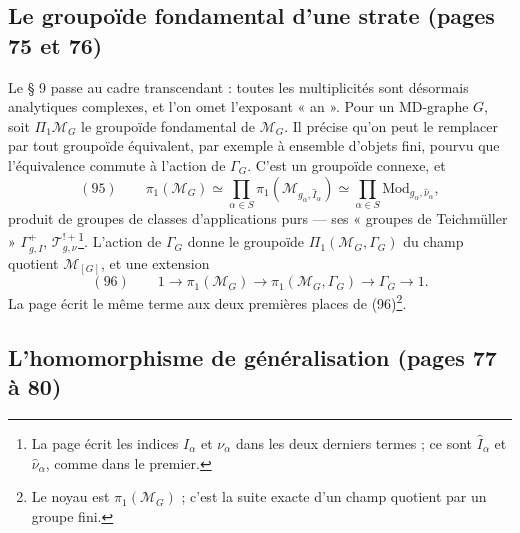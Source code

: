 \documentclass[11pt,a4paper]{article}
\begin{document}
\subsection*{Le groupoïde fondamental d'une strate (pages 75 et 76)}

Le § 9 passe au cadre transcendant : toutes les multiplicités sont désormais
analytiques complexes, et l'on omet l'exposant « an ». Pour un MD-graphe $G$,
soit $\Pi_1\mathcal{M}_G$ le groupoïde fondamental de $\mathcal{M}_G$. Il
précise qu'on peut le remplacer par tout groupoïde équivalent, par exemple à
ensemble d'objets fini, pourvu que l'équivalence commute à l'action de
$\Gamma_G$. C'est un groupoïde connexe, et
\[
(95) \qquad \pi_1(\mathcal{M}_G) \simeq \prod_{\alpha \in S}
\pi_1(\mathcal{M}_{g_\alpha, \widehat{I}_\alpha}) \simeq \prod_{\alpha \in S}
\mathrm{Mod}_{g_\alpha, \widehat{\nu}_\alpha},
\]
produit de groupes de classes d'applications purs — ses « groupes de
Teichmüller » $\Gamma^{+}_{g, I}$, $\mathcal{T}^{!+}_{g,\nu}$\footnote{La page
écrit les indices $I_\alpha$ et $\nu_\alpha$ dans les deux derniers termes ; ce
sont $\widehat{I}_\alpha$ et $\widehat{\nu}_\alpha$, comme dans le premier.}.
L'action de $\Gamma_G$ donne le groupoïde $\Pi_1(\mathcal{M}_G, \Gamma_G)$ du
champ quotient $\mathcal{M}_{[G]}$, et une extension
\[
(96) \qquad 1 \to \pi_1(\mathcal{M}_G) \to \pi_1(\mathcal{M}_G, \Gamma_G) \to
\Gamma_G \to 1 .
\]
La page écrit le même terme aux deux premières places de (96)\footnote{Le noyau
est $\pi_1(\mathcal{M}_G)$ ; c'est la suite exacte d'un champ quotient par un
groupe fini.}.

\subsection*{L'homomorphisme de généralisation (pages 77 à 80)}
\end{document}
